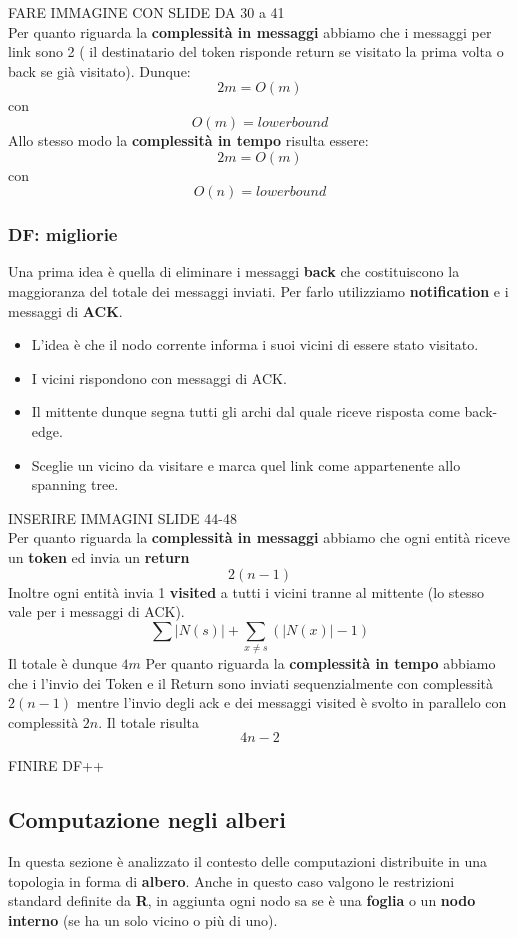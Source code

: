 \documentclass[12pt]{article}
\begin{document}
			FARE IMMAGINE CON SLIDE DA 30 a 41\\
			
			Per quanto riguarda la \textbf{complessità in messaggi} abbiamo che i messaggi per link sono 2 ( il destinatario del token risponde return se visitato la prima volta o back se già visitato). Dunque:
			$$2m = O(m) $$ con $$O(m) = lower bound $$
			Allo stesso modo la \textbf{complessità in tempo} risulta essere: 
			$$2m = O(m) $$ 	con $$O(n) = lower bound $$
		
		\subsubsection{DF: migliorie}
			Una prima idea è quella di eliminare i messaggi \textbf{back} che costituiscono la maggioranza del totale dei messaggi inviati. Per farlo utilizziamo \textbf{notification} e i messaggi di \textbf{ACK}. 
			\begin{itemize}
				\item L'idea è che il nodo corrente informa i suoi vicini di essere stato visitato.
				\item I vicini rispondono con messaggi di ACK. 
				\item Il mittente dunque segna tutti gli archi dal quale riceve risposta come back-edge.
				\item Sceglie un vicino da visitare e marca quel link come appartenente allo spanning tree. 
			\end{itemize}
			
			INSERIRE IMMAGINI SLIDE 44-48\\
			
			Per quanto riguarda la \textbf{complessità in messaggi} abbiamo che ogni entità riceve un \textbf{token} ed invia un \textbf{return} $$2(n-1)$$
			Inoltre ogni entità invia 1 \textbf{visited} a tutti i vicini tranne al mittente (lo stesso vale per i messaggi di ACK).
			$$\sum|N(s)|+\sum_{x\neq s}(|N(x)|-1) $$
			Il totale è dunque $4m $
			Per quanto riguarda la \textbf{complessità in tempo} abbiamo che i l'invio dei Token e il Return sono inviati sequenzialmente con complessità $2(n-1)$ mentre l'invio degli ack e dei messaggi visited è svolto in parallelo con complessità $2n$. Il totale risulta $$4n-2	$$
			
			FINIRE DF++\\
			
\subsection{Computazione negli alberi}		
	In questa sezione è analizzato il contesto delle computazioni distribuite in una topologia in forma di \textbf{albero}. Anche in questo caso valgono le restrizioni standard definite da \textbf{R}, in aggiunta ogni nodo sa se è una \textbf{foglia} o un \textbf{nodo interno} (se ha un solo vicino o più di uno).
	
\end{document}

